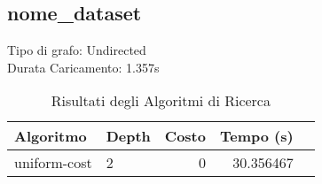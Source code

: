 
\subsection{nome\_dataset}

Tipo di grafo: Undirected\\
Durata Caricamento: 1.357s

\begin{table}[h]
	\centering
	\begin{tabular}{|l|l|r|r|r|}
		\hline
		Algoritmo    & Depth & Costo & Tempo (s) \\
		\hline
		uniform-cost & 2     & 0     & 30.356467 \\
		\hline
	\end{tabular}
	\caption{Risultati degli Algoritmi di Ricerca}
\end{table}
